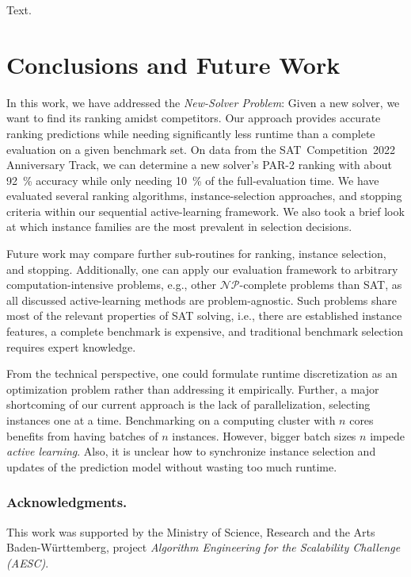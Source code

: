 \documentclass[runningheads]{llncs}
\begin{document}
Text.

\section{Conclusions and Future Work}

In this work, we have addressed the \emph{New-Solver Problem}:
Given a new solver, we want to find its ranking amidst competitors.
Our approach provides accurate ranking predictions while needing significantly less runtime than a complete evaluation on a given benchmark set.
On data from the SAT~Competition~2022 Anniversary Track, we can determine a new solver's PAR-2 ranking with about \SI{92}{\%} accuracy while only needing \SI{10}{\%} of the full-evaluation time.
We have evaluated several ranking algorithms, instance-selection approaches, and stopping criteria within our sequential active-learning framework.
We also took a brief look at which instance families are the most prevalent in selection decisions.

Future work may compare further sub-routines for ranking, instance selection, and stopping.
Additionally, one can apply our evaluation framework to arbitrary computation-intensive problems, e.g., other $\mathcal{NP}$-complete problems than SAT, as all discussed active-learning methods are problem-agnostic.
Such problems share most of the relevant properties of SAT solving, i.e., there are established instance features, a complete benchmark is expensive, and traditional benchmark selection requires expert knowledge.

From the technical perspective, one could formulate runtime discretization as an optimization problem rather than addressing it empirically.
Further, a major shortcoming of our current approach is the lack of parallelization, selecting instances one at a time.
Benchmarking on a computing cluster with $n$ cores benefits from having batches of $n$ instances.
However, bigger batch sizes $n$ impede \emph{active learning}.
Also, it is unclear how to synchronize instance selection and updates of the prediction model without wasting too much runtime.

\subsubsection*{Acknowledgments.}

This work was supported by the Ministry of Science, Research and the Arts Baden-Württemberg, project \emph{Algorithm Engineering for the Scalability Challenge (AESC)}.

%
%


\end{document}
